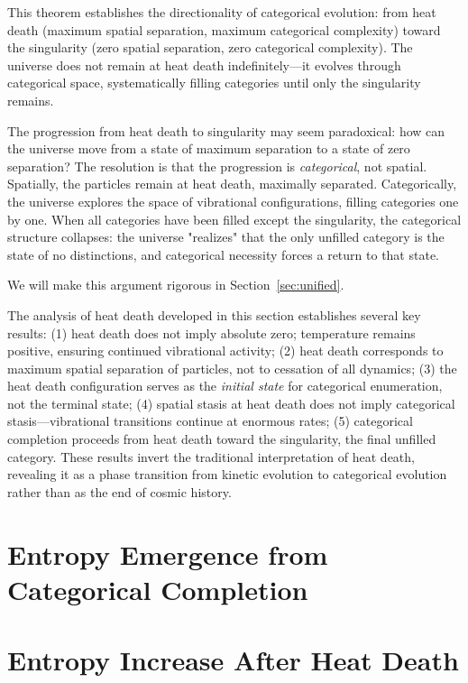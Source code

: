 \documentclass[12pt,a4paper]{article}
\theoremstyle{definition}
\theoremstyle{remark}
\begin{document}
This theorem establishes the directionality of categorical evolution: from heat death (maximum spatial separation, maximum categorical complexity) toward the singularity (zero spatial separation, zero categorical complexity). The universe does not remain at heat death indefinitely—it evolves through categorical space, systematically filling categories until only the singularity remains.

The progression from heat death to singularity may seem paradoxical: how can the universe move from a state of maximum separation to a state of zero separation? The resolution is that the progression is \emph{categorical}, not spatial. Spatially, the particles remain at heat death, maximally separated. Categorically, the universe explores the space of vibrational configurations, filling categories one by one. When all categories have been filled except the singularity, the categorical structure collapses: the universe "realizes" that the only unfilled category is the state of no distinctions, and categorical necessity forces a return to that state.

We will make this argument rigorous in Section~\ref{sec:unified}.

The analysis of heat death developed in this section establishes several key results: (1) heat death does not imply absolute zero; temperature remains positive, ensuring continued vibrational activity; (2) heat death corresponds to maximum spatial separation of particles, not to cessation of all dynamics; (3) the heat death configuration serves as the \emph{initial state} for categorical enumeration, not the terminal state; (4) spatial stasis at heat death does not imply categorical stasis—vibrational transitions continue at enormous rates; (5) categorical completion proceeds from heat death toward the singularity, the final unfilled category. These results invert the traditional interpretation of heat death, revealing it as a phase transition from kinetic evolution to categorical evolution rather than as the end of cosmic history.



\section{Entropy Emergence from Categorical Completion}
\label{sec:entropy}
\section{Entropy Increase After Heat Death}
\label{sec:entropy}
\end{document}
